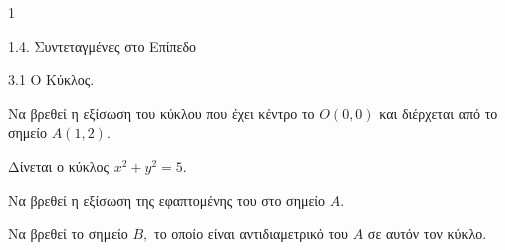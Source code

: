 \begin{ylh}{1}
    \item 1.4. Συντεταγμένες στο Επίπεδο
    \item 3.1 Ο Κύκλος.
\end{ylh}
\begin{alist}
\item Να βρεθεί η εξίσωση του κύκλου που έχει κέντρο το $O(0,0)$ και διέρχεται από το σημείο $A(1,2).$ 
\item Δίνεται ο κύκλος $x^2 + y^2 = 5.$
    \begin{rlist}
    \item Να βρεθεί η εξίσωση της εφαπτομένης του στο σημείο $A.$ 
    \item Να βρεθεί το σημείο $B,$ το οποίο είναι αντιδιαμετρικό του $A$ σε αυτόν τον κύκλο. 
    \end{rlist}
\end{alist}